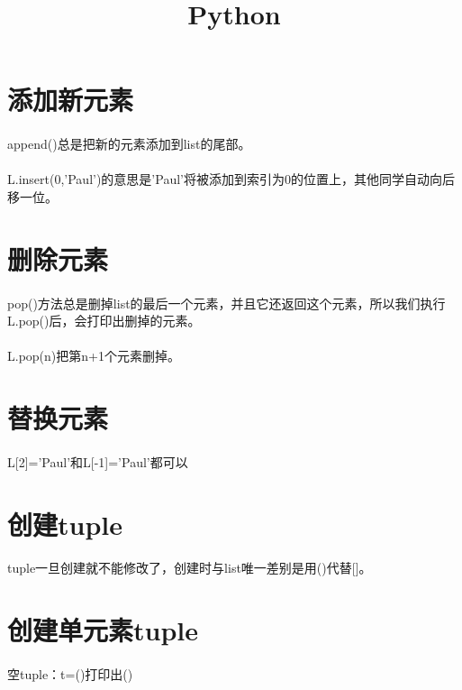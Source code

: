 \documentclass{article}
\begin{document}
\begin{CJK}{UTF8}{gbsn}\title{Python}
\date{}
\maketitle
\section{添加新元素}
\paragraph{}
append()总是把新的元素添加到list的尾部。
\paragraph{}
L.insert(0,'Paul')的意思是'Paul'将被添加到索引为0的位置上，其他同学自动向后移一位。
\section{删除元素}
\paragraph{}
pop()方法总是删掉list的最后一个元素，并且它还返回这个元素，所以我们执行L.pop()后，会打印出删掉的元素。
\paragraph{}
L.pop(n)把第n+1个元素删掉。
\section{替换元素}
\paragraph{}
L[2]='Paul'和L[-1]='Paul'都可以
\section{创建tuple}
\paragraph{}
tuple一旦创建就不能修改了，创建时与list唯一差别是用()代替[]。
\section{创建单元素tuple}
\paragraph{}
空tuple：t=()打印出()

\end{CJK}
\end{document}
